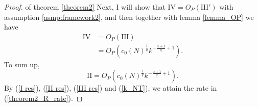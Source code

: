 \begin{proof}{of theorem \ref{theorem2}}
Next, I will show that $\mathrm{IV} = O_P(\mathrm{III'})$ with assumption \ref{asmp:framework2}, and then together with lemma \ref{lemma_OP} we have
\begin{equation}
	\begin{split}
		\mathrm{IV} &= O_P( \mathrm{III} ) \\
        &= O_P(c_0(N)^{\frac{1}{q}} k^{-\frac{\alpha+1}{q}+1}) .
	\end{split} 
	\label{VI}
\end{equation}
To sum up, 
\begin{equation}
	\mathrm{II} = O_P( c_0(N)^{\frac{1}{q}}k^{-\frac{\alpha+1}{q}+1}  ). 
	\label{II res}
\end{equation}
By (\ref{I res}), (\ref{II res}), (\ref{III res}) and (\ref{k_NT}), we attain the rate in (\ref{theorem2_R_rate}).


\end{proof}
